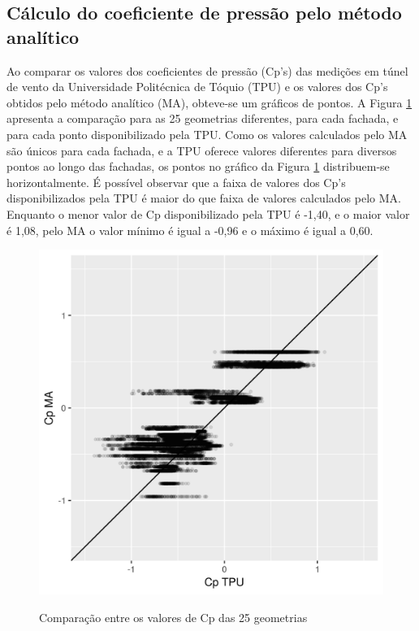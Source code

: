 \documentclass[brazil,hardcopy,openany,a4paper]{ufscthesis}
\begin{document}
		\subsection{Cálculo do coeficiente de pressão pelo método analítico}
		
		Ao comparar os valores dos coeficientes de pressão (Cp’s) das medições em túnel de vento da Universidade Politécnica de Tóquio (TPU) e os valores dos Cp’s obtidos pelo método analítico (MA), obteve-se um gráficos de pontos. 
		A Figura \ref{fig:cp_diff_scatter_all} apresenta a comparação para as 25 geometrias diferentes, para cada fachada, e para cada ponto disponibilizado pela TPU.
		Como os valores calculados pelo MA são únicos para cada fachada, e a TPU oferece valores diferentes para diversos pontos ao longo das fachadas, os pontos no gráfico da Figura \ref{fig:cp_diff_scatter_all} distribuem-se horizontalmente. 
		É possível observar que a faixa de valores dos Cp's disponibilizados pela TPU é maior do que  faixa de valores calculados pelo MA. Enquanto o menor valor de Cp disponibilizado pela TPU é -1,40, e o maior valor é 1,08, pelo MA o valor mínimo é igual a -0,96 e o máximo é igual a 0,60.
		
		\begin{figure}[H]
			\centering
			\caption{Comparação entre os valores de Cp das 25 geometrias}
			\includegraphics[width=1\linewidth]{img/cp_diff_scatter_all.png}
			\label{fig:cp_diff_scatter_all}
		\end{figure}
		
\end{document}
